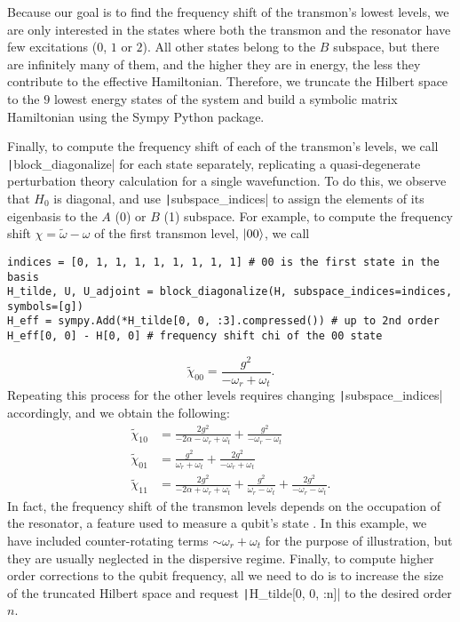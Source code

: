 Because our goal is to find the frequency shift of the transmon's lowest
levels, we are only interested in the states where both the transmon and the
resonator have few excitations ($0$, $1$ or $2$).
All other states belong to the $B$ subspace, but there are infinitely many of
them, and the higher they are in energy, the less they contribute to the
effective Hamiltonian.
Therefore, we truncate the Hilbert space to the $9$ lowest energy states of the
system and build a symbolic matrix Hamiltonian using the Sympy Python package.

Finally, to compute the frequency shift of each of the transmon's levels, we
call \texttt|block_diagonalize| for each state separately,
replicating a quasi-degenerate perturbation theory calculation for a single
wavefunction.
To do this, we observe that $H_0$ is diagonal, and use
\texttt|subspace_indices| to assign the elements of its eigenbasis
to the $A$ (0) or $B$ (1) subspace.
For example, to compute the frequency shift $\chi = \tilde{\omega} - \omega$ of
the first transmon level, $\ket{00}$, we call
%
\begin{verbatim}
indices = [0, 1, 1, 1, 1, 1, 1, 1, 1] # 00 is the first state in the basis
H_tilde, U, U_adjoint = block_diagonalize(H, subspace_indices=indices, symbols=[g])
H_eff = sympy.Add(*H_tilde[0, 0, :3].compressed()) # up to 2nd order
H_eff[0, 0] - H[0, 0] # frequency shift chi of the 00 state
\end{verbatim}
%
\begin{equation}
    \tilde{\chi}_{00} = \frac{g^{2}}{- \omega_{r} + \omega_{t}}.
\end{equation}
%
Repeating this process for the other levels requires changing
\texttt|subspace_indices| accordingly, and we obtain the following:
%
\begin{align}
    \tilde{\chi}_{10} &= \frac{2 g^{2}}{- 2 \alpha - \omega_{r} + \omega_{t}} + \frac{g^{2}}{- \omega_{r} - \omega_{t}} \\
    \tilde{\chi}_{01} &= \frac{g^{2}}{\omega_{r} + \omega_{t}} + \frac{2 g^{2}}{- \omega_{r} + \omega_{t}} \\
    \tilde{\chi}_{11} &= \frac{2 g^{2}}{- 2 \alpha + \omega_{r} + \omega_{t}} + \frac{g^{2}}{\omega_{r} - \omega_{t}} + \frac{2 g^{2}}{- \omega_{r} - \omega_{t}}.
\end{align}
In fact, the frequency shift of the transmon levels depends on the occupation
of the resonator, a feature used to measure a qubit's state \cite{Blais_2004}.
In this example, we have included counter-rotating terms $\sim \omega_{r} +
\omega_{t}$ for the purpose of illustration, but they are usually neglected in
the dispersive regime.
Finally, to compute higher order corrections to the qubit frequency, all we need
to do is to increase the size of the truncated Hilbert space and request
\texttt|H_tilde[0, 0, :n]| to the desired order $n$.


